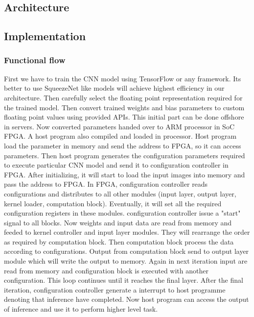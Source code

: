 \documentclass[conference]{IEEEtran}
\begin{document}
\subsection{Architecture}
%

\subsection{Implementation}
\subsubsection{Functional flow}
First we have to train the CNN model using TensorFlow or any framework. Its better to use SqueezeNet like models will achieve highest efficiency in our architecture. Then carefully select the floating point representation required for the trained model. Then convert trained weights and bias parameters to custom floating point values using provided APIs. This initial part can be done offshore in servers. Now converted parameters handed over to ARM processor in SoC FPGA. A host program also compiled and loaded in processor. Host program load the parameter in memory and send the address to FPGA, so it can access parameters. Then host program generates the configuration parameters required to execute particular CNN model and send it to configuration controller in FPGA. After initializing, it will start to load the input images into memory and pass the address to FPGA. 
In FPGA, configuration controller reads configurations and distributes to all other modules (input layer, output layer, kernel loader, computation block). Eventually, it will set all the required configuration registers in these modules. configuration controller issue a "start" signal to all blocks. Now weights and input data are read from memory and feeded to kernel controller and input layer modules. They will rearrange the order as required by computation block. Then computation block process the data according to configurations. Output from computation block send to output layer module which will write the output to memory. Again in next iteration input are read from memory and configuration block is executed with another configuration. This loop continues until it reaches the final layer. After the final iteration, configuration controller generate a interrupt to host programme denoting that inference have completed. Now host program can access the output of inference and use it to perform higher level task. 
\end{document}
